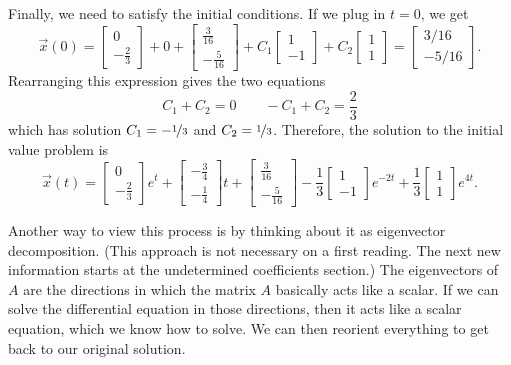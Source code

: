 \begin{exampleSol}
Finally, we need to satisfy the initial conditions. If we plug in $t=0$, we get
\begin{equation*}
\vec{x}(0) = \begin{bmatrix} 0 \\ -\frac{2}{3} \end{bmatrix} + 0 + \begin{bmatrix} \frac{3}{16} \\ -\frac{5}{16} \end{bmatrix} + C_1\begin{bmatrix} 1 \\ -1 \end{bmatrix} + C_2 \begin{bmatrix} 1 \\ 1 \end{bmatrix} =
\begin{bmatrix}
3/16 \\
-5/16
\end{bmatrix}.
\end{equation*}
Rearranging this expression gives the two equations
\begin{equation*}
C_1 + C_2 = 0 \qquad -C_1 + C_2 = \frac{2}{3}
\end{equation*}
which has solution $C_1 = -\nicefrac{1}{3}$ and $C_2 = \nicefrac{1}{3}$. Therefore, the solution to the initial value problem is
\begin{equation*}
\vec{x}(t) = \begin{bmatrix} 0 \\ -\frac{2}{3} \end{bmatrix} e^t + \begin{bmatrix} -\frac{3}{4} \\ -\frac{1}{4} \end{bmatrix} t + \begin{bmatrix} \frac{3}{16} \\ -\frac{5}{16} \end{bmatrix} - \frac{1}{3}\begin{bmatrix} 1 \\ -1 \end{bmatrix}e^{-2t} + \frac{1}{3}\begin{bmatrix} 1 \\ 1 \end{bmatrix} e^{4t}.
\end{equation*}
\end{exampleSol}

Another way to view this process is by thinking about it as eigenvector decomposition. (This approach is not necessary on a first reading. The next new information starts at the undetermined coefficients section.) The eigenvectors of $A$ are the directions in which the matrix $A$ basically acts like a scalar. If we can solve the differential equation in those directions, then it acts like a scalar equation, which we know how to solve. We can then reorient everything to get back to our original solution. 


